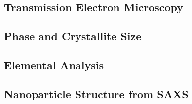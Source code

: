 \documentclass[\main/dresen_thesis.tex]{subfiles}
\renewcommand{\thisPath}{\main/chapters/monolayers/nanoparticles/}
\begin{document}
  \label{sec:monolayers:nanoparticles}

  \subsection{Transmission Electron Microscopy}
    
      \FloatBarrier

  \subsection{Phase and Crystallite Size}
  
    \FloatBarrier

  \subsection{Elemental Analysis}
  
    \FloatBarrier

  \subsection{Nanoparticle Structure from SAXS}
  
    \FloatBarrier
\end{document}
